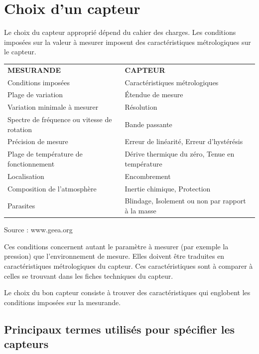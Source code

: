 \section{Choix d'un capteur}

Le choix du capteur approprié dépend du cahier des charges. Les conditions imposées sur la valeur à mesurer imposent des caractéristiques métrologiques sur le capteur.
\begin {center}
\begin{tabular}{|p{6cm}|p{6cm}|}\hline
\textbf{MESURANDE} & \textbf{CAPTEUR} \\
Conditions imposées & Caractéristiques métrologiques \\\hline\hline
Plage de variation &	Étendue de mesure \\\hline
Variation minimale à mesurer & Résolution \\\hline
Spectre de fréquence ou vitesse de rotation  & Bande passante \\\hline
Précision de mesure	& Erreur de linéarité, Erreur d'hystérésis \\\hline
Plage de température de fonctionnement &	Dérive thermique du zéro, Tenue en température \\\hline
Localisation &	Encombrement \\\hline
Composition de l'atmosphère	 & Inertie chimique, Protection \\\hline
Parasites &	Blindage, Isolement ou non par rapport à la masse \\\hline
\end{tabular}
\end{center}
Source : www.geea.org

Ces conditions concernent autant le paramètre à mesurer (par exemple la pression) que l'environnement de mesure. Elles doivent être traduites en caractéristiques métrologiques du capteur. Ces caractéristiques sont à comparer à celles se trouvant dans les fiches techniques du capteur.

Le choix du bon capteur consiste à trouver des caractéristiques qui englobent les conditions imposées sur la mesurande.

\subsection{Principaux termes utilisés pour spécifier les capteurs}

